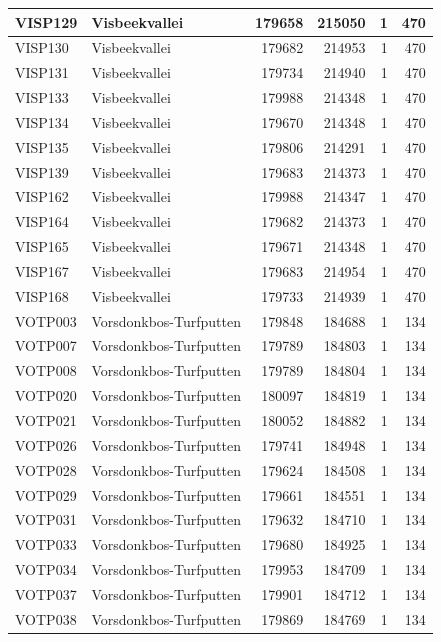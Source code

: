 \documentclass[11pt,]{book}
\begin{document}
\begin{table}
\begin{tabular}[t]{l|l|r|r|r|r}
\hline
VISP129 & Visbeekvallei & 179658 & 215050 & 1 & 470\\
\hline
VISP130 & Visbeekvallei & 179682 & 214953 & 1 & 470\\
\hline
VISP131 & Visbeekvallei & 179734 & 214940 & 1 & 470\\
\hline
VISP133 & Visbeekvallei & 179988 & 214348 & 1 & 470\\
\hline
VISP134 & Visbeekvallei & 179670 & 214348 & 1 & 470\\
\hline
VISP135 & Visbeekvallei & 179806 & 214291 & 1 & 470\\
\hline
VISP139 & Visbeekvallei & 179683 & 214373 & 1 & 470\\
\hline
VISP162 & Visbeekvallei & 179988 & 214347 & 1 & 470\\
\hline
VISP164 & Visbeekvallei & 179682 & 214373 & 1 & 470\\
\hline
VISP165 & Visbeekvallei & 179671 & 214348 & 1 & 470\\
\hline
VISP167 & Visbeekvallei & 179683 & 214954 & 1 & 470\\
\hline
VISP168 & Visbeekvallei & 179733 & 214939 & 1 & 470\\
\hline
VOTP003 & Vorsdonkbos-Turfputten & 179848 & 184688 & 1 & 134\\
\hline
VOTP007 & Vorsdonkbos-Turfputten & 179789 & 184803 & 1 & 134\\
\hline
VOTP008 & Vorsdonkbos-Turfputten & 179789 & 184804 & 1 & 134\\
\hline
VOTP020 & Vorsdonkbos-Turfputten & 180097 & 184819 & 1 & 134\\
\hline
VOTP021 & Vorsdonkbos-Turfputten & 180052 & 184882 & 1 & 134\\
\hline
VOTP026 & Vorsdonkbos-Turfputten & 179741 & 184948 & 1 & 134\\
\hline
VOTP028 & Vorsdonkbos-Turfputten & 179624 & 184508 & 1 & 134\\
\hline
VOTP029 & Vorsdonkbos-Turfputten & 179661 & 184551 & 1 & 134\\
\hline
VOTP031 & Vorsdonkbos-Turfputten & 179632 & 184710 & 1 & 134\\
\hline
VOTP033 & Vorsdonkbos-Turfputten & 179680 & 184925 & 1 & 134\\
\hline
VOTP034 & Vorsdonkbos-Turfputten & 179953 & 184709 & 1 & 134\\
\hline
VOTP037 & Vorsdonkbos-Turfputten & 179901 & 184712 & 1 & 134\\
\hline
VOTP038 & Vorsdonkbos-Turfputten & 179869 & 184769 & 1 & 134\\

\end{tabular}
\end{table}
\end{document}
